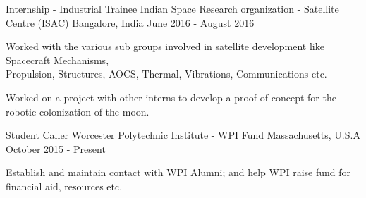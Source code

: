 \begin{cventries}
  \cventry
    {Internship - Industrial Trainee}
    {Indian Space Research organization - Satellite Centre (ISAC)}
    {Bangalore, India}
    {June 2016 - August 2016}
    {
      \begin{cvitems}
        \item {Worked with the various sub groups involved in satellite development like Spacecraft Mechanisms, \\ Propulsion, Structures, AOCS, Thermal, Vibrations, Communications etc.}
        \item {Worked on a project with other interns to develop a proof of concept for the robotic colonization of the moon.}
      \end{cvitems}
    }
\space
  \cventry
    {Student Caller}
    {Worcester Polytechnic Institute - WPI Fund}
    {Massachusetts, U.S.A}
    {October 2015 - Present}
    {
      \begin{cvitems}
        \item {Establish and maintain contact with WPI Alumni; and help WPI raise fund for financial aid, resources etc.}
      \end{cvitems}
    }

\end{cventries}

